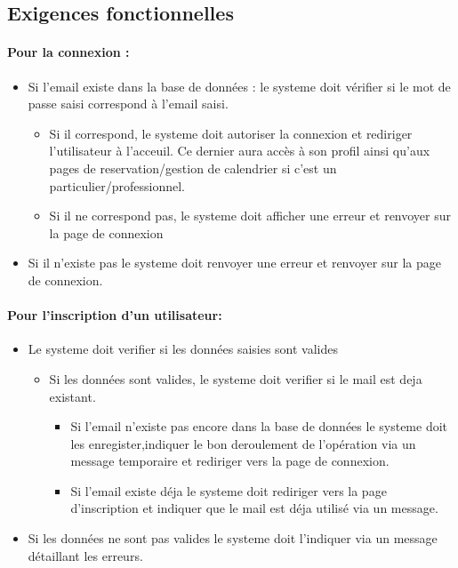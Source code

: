 \documentclass{article}
\begin{document}
\subsection{Exigences fonctionnelles}
\paragraph{Pour la connexion : }

\begin{itemize}
\item Si l'email existe dans la base de données :
	le systeme doit vérifier si le mot de passe saisi
	correspond à l'email saisi.
		\begin{itemize}
		\item Si il correspond, le systeme doit autoriser la connexion et
			rediriger l'utilisateur à l'acceuil. Ce dernier aura accès à son
			profil ainsi qu'aux pages de reservation/gestion de calendrier
			si c'est un particulier/professionnel.
		\item Si il ne correspond pas, le systeme doit afficher une erreur
			et renvoyer sur la page de connexion
		\end{itemize}
\item Si il n'existe pas le systeme doit renvoyer une erreur
	et renvoyer sur la page de connexion.
\end{itemize}


\paragraph{Pour l'inscription d'un utilisateur: }
\begin{itemize}
\item Le systeme doit verifier si les données saisies sont valides
	\begin{itemize}
	\item Si les données sont valides, le systeme doit verifier si le mail
		est deja existant.
		\begin{itemize}
		\item Si l'email n'existe pas encore dans la base de données le systeme
			doit les enregister,indiquer le bon deroulement de l'opération via un message temporaire et rediriger
			 vers la page de connexion.
		\item Si l'email existe déja le systeme doit rediriger vers
			la page d'inscription et indiquer que le mail est déja utilisé
			via un message.
		\end{itemize}
	\end{itemize}
\item Si les données ne sont pas valides le systeme doit l'indiquer
	via un message détaillant les erreurs.
\end{itemize}
\end{document}
